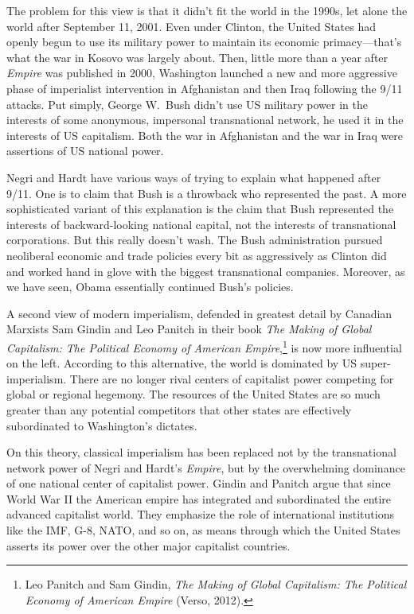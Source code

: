 The problem for this view is that it didn't fit the world in the 1990s, let alone the world after September 11, 2001. Even under Clinton, the United States had openly begun to use its military power to maintain its economic primacy---that's what the war in Kosovo was largely about. Then, little more than a year after \emph{Empire} was published in 2000, Washington launched a new and more aggressive phase of imperialist intervention in Afghanistan and then Iraq following the 9/11 attacks. Put simply, George W.\ Bush didn't use US military power in the interests of some anonymous, impersonal transnational network, he used it in the interests of US capitalism. Both the war in Afghanistan and the war in Iraq were assertions of US national power.

Negri and Hardt have various ways of trying to explain what happened after 9/11. One is to claim that Bush is a throwback who represented the past. A more sophisticated variant of this explanation is the claim that Bush represented the interests of backward-looking national capital, not the interests of transnational corporations. But this really doesn't wash. The Bush administration pursued neoliberal economic and trade policies every bit as aggressively as Clinton did and worked hand in glove with the biggest transnational companies. Moreover, as we have seen, Obama essentially continued Bush's policies.

A second view of modern imperialism, defended in greatest detail by Canadian Marxists Sam Gindin and Leo Panitch in their book \emph{The Making of Global Capitalism: The Political Economy of American Empire},\footnote{Leo Panitch and Sam Gindin, \emph{The Making of Global Capitalism: The Political Economy of American Empire} (Verso, 2012).} is now more influential on the left. According to this alternative, the world is dominated by US super-imperialism. There are no longer rival centers of capitalist power competing for global or regional hegemony. The resources of the United States are so much greater than any potential competitors that other states are effectively subordinated to Washington's dictates.

On this theory, classical imperialism has been replaced not by the transnational network power of Negri and Hardt's \emph{Empire}, but by the overwhelming dominance of one national center of capitalist power. Gindin and Panitch argue that since World War II the American empire has integrated and subordinated the entire advanced capitalist world. They emphasize the role of international institutions like the IMF, G-8, NATO, and so on, as means through which the United States asserts its power over the other major capitalist countries.

